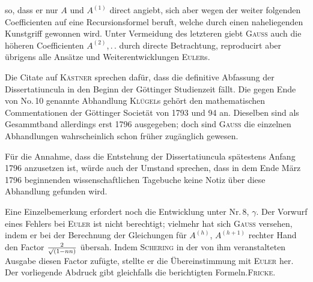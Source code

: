 \noindent so, dass er nur $A$ und $A^{(1)}$ direct angiebt, sich aber wegen der weiter folgenden Coefficienten auf eine Recursionsformel beruft, welche durch einen naheliegenden Kunstgriff gewonnen wird. Unter Vermeidung des letzteren giebt \textsc{Gauss} auch die höheren Coefficienten $A^{(2)}$,\,.\,. durch directe Betrachtung, reproducirt aber übrigens alle Ansätze und Weiterentwicklungen \textsc{Euler}s.

Die Citate auf \textsc{Kästner} sprechen dafür, dass die definitive Abfassung der Dissertatiuncula in den Beginn der Göttinger Studienzeit fällt. Die gegen Ende von No.\,10 genannte Abhandlung \textsc{Klügel}s gehört den mathematischen Commentationen der Göttinger Societät von 1793 und 94 an. Dieselben sind als Gesammtband allerdings erst 1796 ausgegeben; doch sind \textsc{Gauss} die einzelnen Abhandlungen wahrscheinlich schon früher zugänglich gewesen.

Für die Annahme, dass die Entstehung der Dissertatiuncula spätestens Anfang 1796 anzusetzen ist, würde auch der Umstand sprechen, dass in dem Ende März 1796 beginnenden wissenschaftlichen Tagebuche keine Notiz über diese Abhandlung gefunden wird.

Eine Einzelbemerkung erfordert noch die Entwicklung unter Nr.\,8, $\gamma$. Der Vorwurf eines Fehlers bei \textsc{Euler} ist nicht berechtigt; vielmehr hat sich \textsc{Gauss} versehen, indem er bei der Berechnung der Gleichungen für $A^{(h)}$, $A^{(h+1)}$ rechter Hand den Factor $\frac{2}{\mathord{\surd}(1-nn)}$ übersah. Indem \textsc{Schering} in der von ihm veranstalteten Ausgabe diesen Factor zufügte, stellte er die Übereinstimmung mit \textsc{Euler} her. Der vorliegende Abdruck gibt gleichfalls die berichtigten Formeln.\hfill\textsc{Fricke}.

\par\smallskip\hrulefill\smallskip\par

